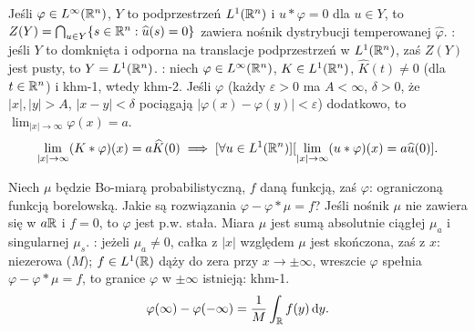 Jeśli  $\varphi \in L^\infty(\mathbb{R}^n)$, $Y$ to podprzestrzeń $L^1(\mathbb{R}^n)$ i $u* \varphi = 0$ dla $u \in Y$, to $Z(Y) = \bigcap_{u \in Y} \{s \in \mathbb{R}^n :  \widehat u (s) = 0\}$ zawiera nośnik dystrybucji temperowanej $\widehat \varphi$.
: jeśli $Y$ to domknięta i odporna na translacje podprzestrzeń w $L^1(\mathbb{R}^n)$, zaś $Z(Y)$ jest pusty, to $Y = L^1(\mathbb{R}^n)$.
: niech $\varphi \in L^\infty(\mathbb{R}^n)$, $K \in L^1(\mathbb{R}^n)$, $\widehat{K}(t) \neq 0$ (dla $t \in \mathbb{R}^n$) i khm-1, wtedy khm-2.
Jeśli $\varphi$  (każdy $\varepsilon > 0$ ma $A < \infty$, $\delta > 0$, że $|x|, |y| >A$, $|x-y| < \delta$ pociągają $|\varphi(x) - \varphi(y)| < \varepsilon$) dodatkowo, to $\lim_{|x| \to \infty} \varphi(x) = a$.
\[
	\lim_{|x| \to \infty} (K  * \varphi)(x) = a \widehat{K}(0) \implies [\forall u \in L^1(\mathbb{R}^n) ] [\lim_{|x| \to \infty} (u  * \varphi)(x) = a \widehat{u}(0)].
\]

Niech  $\mu$ będzie Bo-miarą probabilistyczną, $f$ daną funkcją, zaś $\varphi$: ograniczoną funkcją borelowską.
Jakie są rozwiązania $\varphi  - \varphi * \mu = f$?
Jeśli nośnik $\mu$ nie zawiera się w $a \mathbb{R}$ i $f = 0$, to $\varphi$ jest p.w. stała.
Miara $\mu$ jest sumą absolutnie ciągłej $\mu_a$ i singularnej $\mu_s$.
: jeżeli $\mu_a \neq 0$, całka z $|x|$ względem $\mu$ jest skończona, zaś z $x$: niezerowa ($M$); $f \in L^1(\mathbb{R})$ dąży do zera przy $x \to \pm \infty$, wreszcie $\varphi$ spełnia $\varphi - \varphi * \mu = f$, to granice $\varphi$ w $\pm \infty$ istnieją: khm-1.
\[
	\varphi(\infty) - \varphi(- \infty) = \frac 1 M \int_{\mathbb{R}} f(y)  \,\textrm{d} y.
\]